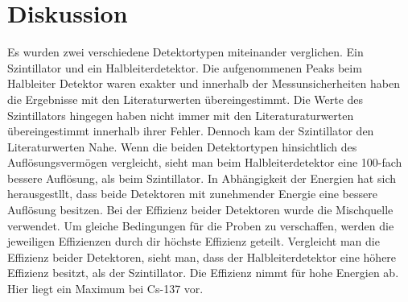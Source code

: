 \section{Diskussion}
Es wurden zwei verschiedene Detektortypen miteinander verglichen. Ein Szintillator und ein Halbleiterdetektor. Die aufgenommenen Peaks beim Halbleiter Detektor waren exakter und innerhalb der Messunsicherheiten haben die Ergebnisse mit den Literaturwerten übereingestimmt. Die Werte des Szintillators hingegen haben nicht immer mit den Literaturaturwerten übereingestimmt innerhalb ihrer Fehler. Dennoch kam der Szintillator den Literaturwerten Nahe. Wenn die beiden Detektortypen hinsichtlich des Auflösungsvermögen vergleicht, sieht man beim Halbleiterdetektor eine 100-fach bessere Auflösung, als beim Szintillator. In Abhängigkeit der Energien hat sich herausgestllt, dass beide Detektoren mit zunehmender Energie eine bessere Auflösung besitzen. Bei der Effizienz beider Detektoren wurde die Mischquelle verwendet. Um gleiche Bedingungen für die Proben zu verschaffen, werden die jeweiligen Effizienzen durch dir höchste Effizienz geteilt. Vergleicht man die Effizienz beider Detektoren, sieht man, dass der Halbleiterdetektor eine höhere Effizienz besitzt, als der Szintillator.
Die Effizienz nimmt für hohe Energien ab. Hier liegt ein Maximum bei Cs-137 vor.


